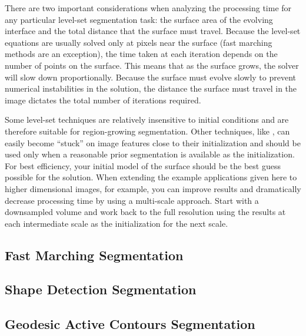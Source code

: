 There are two important considerations when analyzing the processing time for
any particular level-set segmentation task: the surface area of the evolving
interface and the total distance that the surface must travel.  Because the
level-set equations are usually solved only at pixels near the surface (fast
marching methods are an exception), the time taken at each iteration depends on
the number of points on the surface.  This means that as the surface grows, the
solver will slow down proportionally.  Because the surface must evolve slowly
to prevent numerical instabilities in the solution, the distance the surface
must travel in the image dictates the total number of iterations required.

Some level-set techniques are relatively insensitive to initial conditions and are
therefore suitable for region-growing segmentation. Other techniques, like
, can easily become
``stuck'' on image features close to their initialization and should be used
only when a reasonable prior segmentation is available as the initialization.
For best efficiency, your initial model of the surface should be the
best guess possible for the solution.  When extending the example applications
given here to higher dimensional images, for example, you can improve results
and dramatically decrease processing time by using a multi-scale
approach. Start with a downsampled volume and work back to the full resolution
using the results at each intermediate scale as the initialization for the next
scale.


\subsection{Fast Marching Segmentation}
\label{sec:FastMarchingImageFilter}

\ifitkFullVersion

\fi



\subsection{Shape Detection Segmentation}
\label{sec:ShapeDetectionLevelSetFilter}

\ifitkFullVersion

\fi


\subsection{Geodesic Active Contours Segmentation}
\label{sec:GeodesicActiveContourImageFilter}

